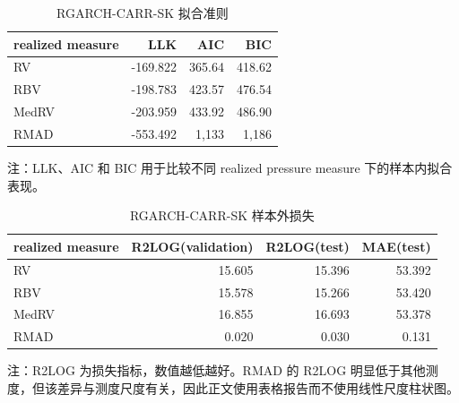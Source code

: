\begin{table}[H]
\centering
\caption{RGARCH-CARR-SK 拟合准则}
\label{tab:rgarch-fit}
\small
\begin{threeparttable}
\begin{tabular}{lrrr}
\toprule
realized measure & LLK & AIC & BIC \\
\midrule
RV & -169.822 & 365.64 & 418.62 \\
RBV & -198.783 & 423.57 & 476.54 \\
MedRV & -203.959 & 433.92 & 486.90 \\
RMAD & -553.492 & 1,133 & 1,186 \\
\bottomrule
\end{tabular}
\begin{tablenotes}[flushleft]
\footnotesize
\item 注：LLK、AIC 和 BIC 用于比较不同 realized pressure measure 下的样本内拟合表现。
\end{tablenotes}
\end{threeparttable}
\end{table}

\begin{table}[H]
\centering
\caption{RGARCH-CARR-SK 样本外损失}
\label{tab:rgarch-loss}
\small
\begin{threeparttable}
\begin{tabular}{lrrr}
\toprule
realized measure & R2LOG(validation) & R2LOG(test) & MAE(test) \\
\midrule
RV & 15.605 & 15.396 & 53.392 \\
RBV & 15.578 & 15.266 & 53.420 \\
MedRV & 16.855 & 16.693 & 53.378 \\
RMAD & 0.020 & 0.030 & 0.131 \\
\bottomrule
\end{tabular}
\begin{tablenotes}[flushleft]
\footnotesize
\item 注：R2LOG 为损失指标，数值越低越好。RMAD 的 R2LOG 明显低于其他测度，但该差异与测度尺度有关，因此正文使用表格报告而不使用线性尺度柱状图。
\end{tablenotes}
\end{threeparttable}
\end{table}
